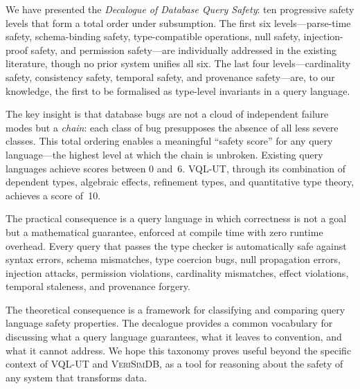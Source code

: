 \documentclass[11pt,a4paper]{article}
\newcommand{\VQL}{\textsc{VQL-UT}}
\newcommand{\VeriSimDB}{\textsc{VeriSimDB}}
\begin{document}
We have presented the \emph{Decalogue of Database Query Safety}:
ten progressive safety levels that form a total order under
subsumption.  The first six levels---parse-time safety, schema-binding
safety, type-compatible operations, null safety, injection-proof
safety, and permission safety---are individually addressed in the
existing literature, though no prior system unifies all six.  The
last four levels---cardinality safety, consistency safety, temporal
safety, and provenance safety---are, to our knowledge, the first to
be formalised as type-level invariants in a query language.

The key insight is that database bugs are not a cloud of independent
failure modes but a \emph{chain}: each class of bug presupposes the
absence of all less severe classes.  This total ordering enables a
meaningful ``safety score'' for any query language---the highest level
at which the chain is unbroken.  Existing query languages achieve
scores between 0 and~6.  \VQL{}, through its combination of dependent
types, algebraic effects, refinement types, and quantitative type
theory, achieves a score of~10.

The practical consequence is a query language in which correctness
is not a goal but a mathematical guarantee, enforced at compile time
with zero runtime overhead.  Every query that passes the type checker
is automatically safe against syntax errors, schema mismatches, type
coercion bugs, null propagation errors, injection attacks, permission
violations, cardinality mismatches, effect violations, temporal
staleness, and provenance forgery.

The theoretical consequence is a framework for classifying and
comparing query language safety properties.  The decalogue provides a
common vocabulary for discussing what a query language guarantees, what
it leaves to convention, and what it cannot address.  We hope this
taxonomy proves useful beyond the specific context of \VQL{} and
\VeriSimDB{}, as a tool for reasoning about the safety of any system
that transforms data.
\end{document}
